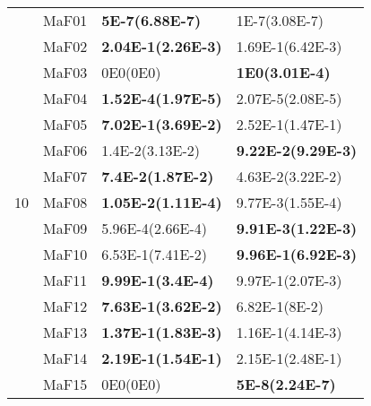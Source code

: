 \documentclass[]{article}
\begin{document}
\begin{table}
\begin{footnotesize}
\begin{tabular}{|l|l|l|l|}
\multirow{15}{*}{10} & MaF01 & \cellcolor{gray95} {\bf 5E-7(6.88E-7)} & \cellcolor{gray95} 1E-7(3.08E-7)\\
 & MaF02 & \cellcolor{gray95} {\bf 2.04E-1(2.26E-3)} & 1.69E-1(6.42E-3)\\
 & MaF03 & 0E0(0E0) & \cellcolor{gray95} {\bf 1E0(3.01E-4)}\\
 & MaF04 & \cellcolor{gray95} {\bf 1.52E-4(1.97E-5)} & 2.07E-5(2.08E-5)\\
 & MaF05 & \cellcolor{gray95} {\bf 7.02E-1(3.69E-2)} & 2.52E-1(1.47E-1)\\
 & MaF06 & 1.4E-2(3.13E-2) & \cellcolor{gray95} {\bf 9.22E-2(9.29E-3)}\\
 & MaF07 & \cellcolor{gray95} {\bf 7.4E-2(1.87E-2)} & 4.63E-2(3.22E-2)\\
 & MaF08 & \cellcolor{gray95} {\bf 1.05E-2(1.11E-4)} & 9.77E-3(1.55E-4)\\
 & MaF09 & 5.96E-4(2.66E-4) & \cellcolor{gray95} {\bf 9.91E-3(1.22E-3)}\\
 & MaF10 & 6.53E-1(7.41E-2) & \cellcolor{gray95} {\bf 9.96E-1(6.92E-3)}\\
 & MaF11 & \cellcolor{gray95} {\bf 9.99E-1(3.4E-4)} & 9.97E-1(2.07E-3)\\
 & MaF12 & \cellcolor{gray95} {\bf 7.63E-1(3.62E-2)} & 6.82E-1(8E-2)\\
 & MaF13 & \cellcolor{gray95} {\bf 1.37E-1(1.83E-3)} & 1.16E-1(4.14E-3)\\
 & MaF14 & \cellcolor{gray95} {\bf 2.19E-1(1.54E-1)} & \cellcolor{gray95} 2.15E-1(2.48E-1)\\
 & MaF15 & \cellcolor{gray95} 0E0(0E0) & \cellcolor{gray95} {\bf 5E-8(2.24E-7)}\\
\hline


\end{tabular}
\end{footnotesize}
\end{table}
\end{document}
